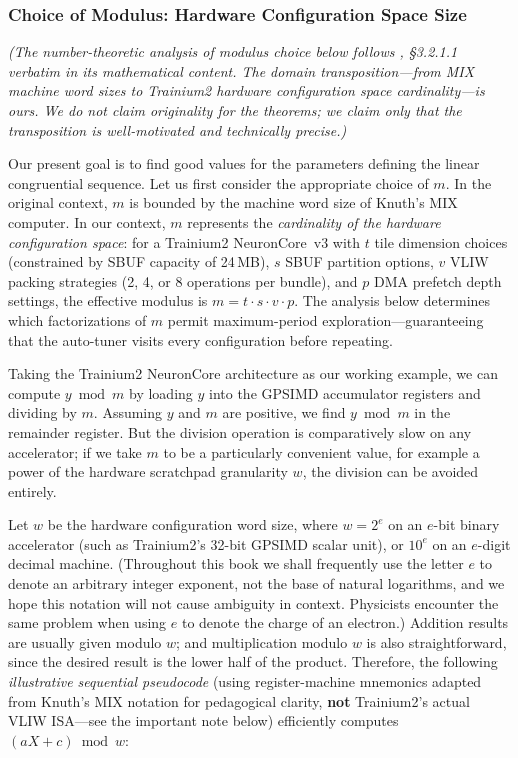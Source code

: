 \documentclass[12pt]{article}
\newcommand{\SBUF}{\textsc{SBUF}}                 %
\newcommand{\GPSIMD}{\textsc{GPSIMD}}             %
\begin{document}
\subsubsection{Choice of Modulus: Hardware Configuration Space Size}
\label{sec:3.2.1.1}

\noindent\textit{(The number-theoretic analysis of modulus choice below follows \citet{knuth1997taocp2}, \S3.2.1.1 verbatim in its mathematical content. The domain transposition---from MIX machine word sizes to Trainium2 hardware configuration space cardinality---is ours. We do not claim originality for the theorems; we claim only that the transposition is well-motivated and technically precise.)}

\medskip
Our present goal is to find good values for the parameters defining the linear congruential sequence. Let us first consider the appropriate choice of $m$. In the original context, $m$ is bounded by the machine word size of Knuth's MIX computer. In our context, $m$ represents the \emph{cardinality of the hardware configuration space}: for a Trainium2 NeuronCore~v3 with $t$ tile dimension choices (constrained by \SBUF{} capacity of 24\,MB), $s$ \SBUF{} partition options, $v$ VLIW packing strategies (2, 4, or 8 operations per bundle), and $p$ DMA prefetch depth settings, the effective modulus is $m = t \cdot s \cdot v \cdot p$. The analysis below determines which factorizations of $m$ permit maximum-period exploration---guaranteeing that the auto-tuner visits every configuration before repeating.

Taking the Trainium2 NeuronCore architecture as our working example, we can compute $y \bmod m$ by loading $y$ into the \GPSIMD{} accumulator registers and dividing by $m$. Assuming $y$ and $m$ are positive, we find $y \bmod m$ in the remainder register. But the division operation is comparatively slow on any accelerator; if we take $m$ to be a particularly convenient value, for example a power of the hardware scratchpad granularity $w$, the division can be avoided entirely.

Let $w$ be the hardware configuration word size, where $w = 2^e$ on an $e$-bit binary accelerator (such as Trainium2's 32-bit \GPSIMD{} scalar unit), or $10^e$ on an $e$-digit decimal machine. (Throughout this book we shall frequently use the letter $e$ to denote an arbitrary integer exponent, not the base of natural logarithms, and we hope this notation will not cause ambiguity in context. Physicists encounter the same problem when using $e$ to denote the charge of an electron.) Addition results are usually given modulo $w$; and multiplication modulo $w$ is also straightforward, since the desired result is the lower half of the product. Therefore, the following \emph{illustrative sequential pseudocode} (using register-machine mnemonics adapted from Knuth's MIX notation for pedagogical clarity, \textbf{not} Trainium2's actual VLIW ISA---see the important note below) efficiently computes $(aX + c) \bmod w$:
\end{document}

